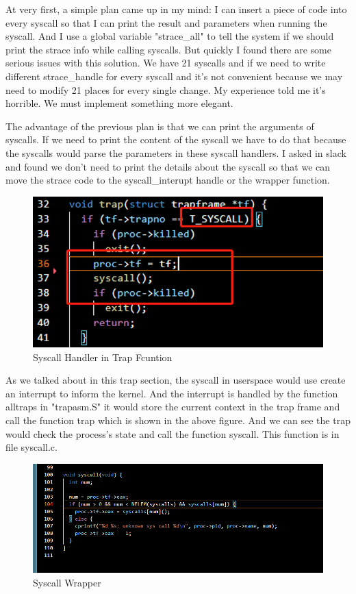 \documentclass[11pt,oneside,a4paper]{article}
\begin{document}
At very first, a simple plan came up in my mind: I can insert a piece of code into every
syscall so that I can print the result and parameters when running the syscall. 
And I use a global variable "strace\_all" to tell the system if we should print the
strace info while calling syscalls. But quickly I found there are some serious 
issues with this solution. We have 21 syscalls and if we need to write different 
strace\_handle for every syscall and it's not convenient because we may need to 
modify 21 places for every single change. My experience told me it's horrible. 
We must implement something more elegant.

The advantage of the previous plan is that we can print the arguments of syscalls.
If we need to print the content of the syscall we have to do that because the 
syscalls would parse the parameters in these syscall handlers. I asked in slack 
and found we don't need to print the details about the syscall so that we can
move the strace code to the syscall\_interupt handle or the wrapper function.

\begin{figure}[H]
    \includegraphics[width=4.75in]{1-1.png}
    \centering
    \caption{Syscall Handler in Trap Fcuntion}
\end{figure}

As we talked about in this trap section, the syscall in userspace would use create an
interrupt to inform the kernel. And the interrupt is handled by the function alltraps 
in "trapasm.S" it would store the current context in the trap frame and call the function 
trap which is shown in the above figure. And we can see the trap would check the 
process's state and call the function syscall. This function is in file syscall.c.

\begin{figure}[H]
    \includegraphics[width=4.75in]{1-2.png}
    \centering
    \caption{Syscall Wrapper}
\end{figure}
\end{document}
